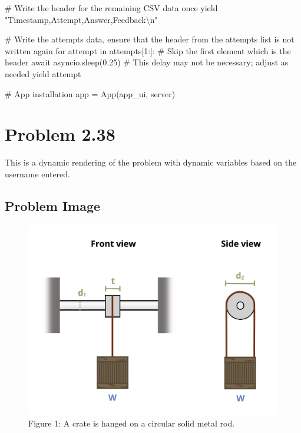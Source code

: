 \documentclass[
  letterpaper,
  DIV=11,
  numbers=noendperiod]{scrreprt}
\newenvironment{Shaded}{\begin{snugshade}}{\end{snugshade}}
\newcommand{\NormalTok}[1]{\textcolor[rgb]{0.00,0.23,0.31}{#1}}
\begin{document}
\begin{Shaded}
\begin{Highlighting}[]
\NormalTok{        \# Write the header for the remaining CSV data once}
\NormalTok{        yield "Timestamp,Attempt,Answer,Feedback\textbackslash{}n"}
        
\NormalTok{        \# Write the attempts data, ensure that the header from the attempts list is not written again}
\NormalTok{        for attempt in attempts[1:]:  \# Skip the first element which is the header}
\NormalTok{            await asyncio.sleep(0.25)  \# This delay may not be necessary; adjust as needed}
\NormalTok{            yield attempt}


\NormalTok{\# App installation}
\NormalTok{app = App(app\_ui, server)}
\end{Highlighting}
\end{Shaded}

\chapter*{Problem 2.38}\label{problem-2.38}


This is a dynamic rendering of the problem with dynamic variables based
on the username entered.

\section*{Problem Image}\label{problem-image-9}


\begin{figure}[H]

{\centering \includegraphics{images/166.png}

}

\caption{Figure 1: A crate is hanged on a circular solid metal rod.}

\end{figure}%
\end{document}

